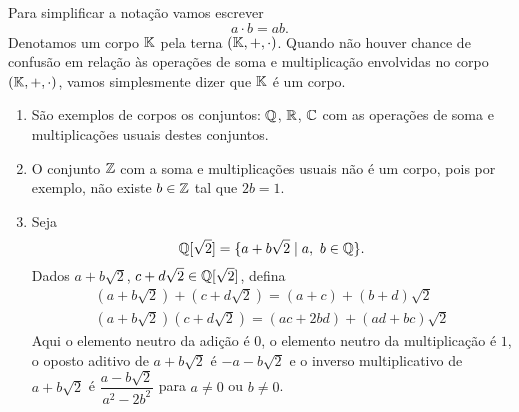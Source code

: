 Para simplificar a nota\c{c}\~ao vamos escrever
\[
  a \cdot b = ab.
\]
Denotamos um corpo $\mathbb{K}$ pela terna $(\mathbb{K}, +, \cdot)$. Quando n\~ao houver chance de confus\~ao em rela\c{c}\~ao \`as opera\c{c}\~oes de soma e multiplica\c{c}\~ao envolvidas no corpo $(\mathbb{K}, +, \cdot)$, vamos simplesmente dizer que $\mathbb{K}$ \'e um corpo.

\begin{exemplo}
	\begin{enumerate}
		\item S\~ao exemplos de corpos os conjuntos: $\mathbb{Q}$, $\mathbb{R}$, $\mathbb{C}$ com as opera\c{c}\~oes de soma e multiplica\c{c}\~oes usuais destes conjuntos.
		
		\item O conjunto $\mathbb{Z}$ com a soma e multiplica\c{c}\~oes usuais n\~ao \'e um corpo, pois por exemplo, n\~ao existe $b \in \mathbb{Z}$ tal que $2b = 1$.
		
		\item Seja
			\[
			  \mathbb{Q}{[\sqrt{2}]} = \{a + b\sqrt{2} \mid a,\ b \in \mathbb{Q}\}.
			\]
			Dados $a + b\sqrt{2}$, $c + d\sqrt{2} \in \mathbb{Q}{[\sqrt{2}]}$, defina
			\begin{align*}
				(a + b\sqrt{2}) + (c + d\sqrt{2}) = (a + c) + (b + d)\sqrt{2}\\
				(a + b\sqrt{2})(c + d\sqrt{2}) = (ac + 2bd) + (ad + bc)\sqrt{2}
			\end{align*}
			Aqui o elemento neutro da adi\c{c}\~ao \'e $0$, o elemento neutro da multiplica\c{c}\~ao \'e $1$, o oposto aditivo de $a + b\sqrt{2}$ \'e $-a - b\sqrt{2}$ e o inverso multiplicativo de $a + b\sqrt{2}$ \'e $\dfrac{a - b\sqrt{2}}{a^2 - 2b^2}$ para $a \ne 0$ ou $b \ne 0$.

	\end{enumerate}
\end{exemplo}

